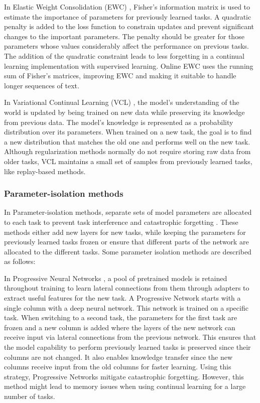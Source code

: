 In Elastic Weight Consolidation (EWC) \cite{kirkpatrick2017overcoming}, Fisher’s information matrix is used to estimate the importance of parameters for previously learned tasks. A quadratic penalty is added to the loss function to constrain updates and prevent significant changes to the important parameters. The penalty should be greater for those parameters whose values considerably affect the performance on previous tasks. The addition of the quadratic constraint leads to less forgetting in a continual learning implementation with supervised learning. Online EWC \cite{schwarz2018progress} uses the running sum of Fisher’s matrices, improving EWC and making it suitable to handle longer sequences of text. 

In Variational Continual Learning (VCL) \cite{nguyen2017variational}, the model’s understanding of the world is updated by being trained on new data while preserving its knowledge from previous data. The model’s knowledge is represented as a probability distribution over its parameters. When trained on a new task, the goal is to find a new distribution that matches the old one and performs well on the new task. Although regularization methods normally do not require storing raw data from older tasks, VCL maintains a small set of samples from previously learned tasks, like replay-based methods. 

\subsubsection{Parameter-isolation methods}
In Parameter-isolation methods, separate sets of model parameters are allocated to each task to prevent task interference and catastrophic forgetting \cite{de2021continual}. These methods either add new layers for new tasks, while keeping the parameters for previously learned tasks frozen or ensure that different parts of the network are allocated to the different tasks. Some parameter isolation methods are described as follows:

In Progressive Neural Networks \cite{rusu2016progressive}, a pool of pretrained models is retained throughout training to learn lateral connections from them through adapters to extract useful features for the new task. A Progressive Network starts with a single column with a deep neural network. This network is trained on a specific task. When switching to a second task, the parameters for the first task are frozen and a new column is added where the layers of the new network can receive input via lateral connections from the previous network. This ensures that the model capability to perform previously learned tasks is preserved since their columns are not changed. It also enables knowledge transfer since the new columns receive input from the old columns for faster learning. Using this strategy, Progressive Networks mitigate catastrophic forgetting. However, this method might lead to memory issues when using continual learning for a large number of tasks.

